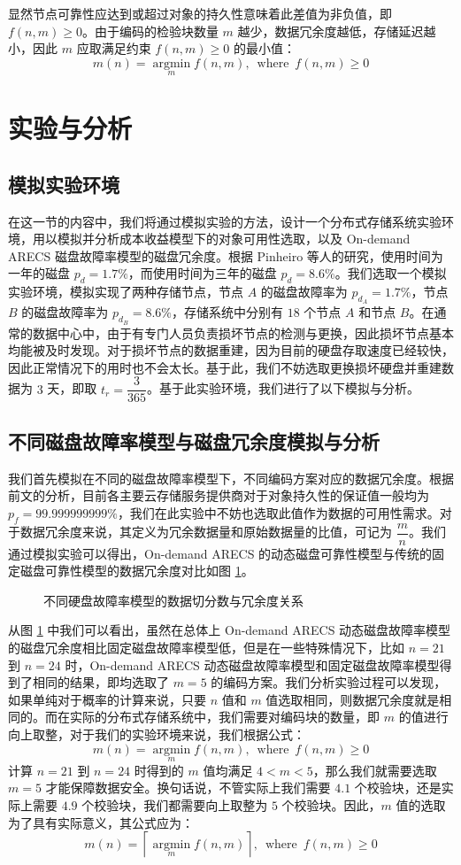 显然节点可靠性应达到或超过对象的持久性意味着此差值为非负值，即 $f(n,m) \geq 0$。由于编码的检验块数量 $m$ 越少，数据冗余度越低，存储延迟越小，因此 $m$ 应取满足约束 $f(n,m) \geq 0$ 的最小值：
$$
m(n)=\operatorname*{argmin}_{m}f(n,m),\ \operatorname*{where}\ f(n,m) \geq 0
$$
\section{实验与分析}
\subsection{模拟实验环境}
在这一节的内容中，我们将通过模拟实验的方法，设计一个分布式存储系统实验环境，用以模拟并分析成本收益模型下的对象可用性选取，以及 On-demand ARECS 磁盘故障率模型的磁盘冗余度。根据 Pinheiro 等人的研究\cite{pinheiro2007failure}，使用时间为一年的磁盘 $p_{d}=1.7\%$，而使用时间为三年的磁盘 $p_{d}=8.6\%$。我们选取一个模拟实验环境，模拟实现了两种存储节点，节点 $A$ 的磁盘故障率为 $p_{d_{A}}=1.7\%$，节点 $B$ 的磁盘故障率为 $p_{d_{B}}=8.6\%$，存储系统中分别有 $18$ 个节点 $A$ 和节点 $B$。在通常的数据中心中，由于有专门人员负责损坏节点的检测与更换，因此损坏节点基本均能被及时发现。对于损坏节点的数据重建，因为目前的硬盘存取速度已经较快，因此正常情况下的用时也不会太长。基于此，我们不妨选取更换损坏硬盘并重建数据为 $3$ 天，即取 $t_{r}=\dfrac{3}{365}$。基于此实验环境，我们进行了以下模拟与分析。
\subsection{不同磁盘故障率模型与磁盘冗余度模拟与分析}
我们首先模拟在不同的磁盘故障率模型下，不同编码方案对应的数据冗余度。根据前文的分析，目前各主要云存储服务提供商对于对象持久性的保证值一般均为 $p_{f}=99.999999999\%$，我们在此实验中不妨也选取此值作为数据的可用性需求。对于数据冗余度来说，其定义为冗余数据量和原始数据量的比值，可记为 $\dfrac{m}{n}$。我们通过模拟实验可以得出，On-demand ARECS 的动态磁盘可靠性模型与传统的固定磁盘可靠性模型的数据冗余度对比如图 \ref{p5}。

\begin{figure}[!htb]
\centering
\resizebox{.8\textwidth}{!}{}
\caption{不同硬盘故障率模型的数据切分数与冗余度关系}
\label{p5}
\end{figure}

从图 \ref{p5} 中我们可以看出，虽然在总体上 On-demand ARECS 动态磁盘故障率模型的磁盘冗余度相比固定磁盘故障率模型低，但是在一些特殊情况下，比如 $n=21$ 到 $n=24$ 时，On-demand ARECS 动态磁盘故障率模型和固定磁盘故障率模型得到了相同的结果，即均选取了 $m=5$ 的编码方案。我们分析实验过程可以发现，如果单纯对于概率的计算来说，只要 $n$ 值和 $m$ 值选取相同，则数据冗余度就是相同的。而在实际的分布式存储系统中，我们需要对编码块的数量，即 $m$ 的值进行向上取整，对于我们的实验环境来说，我们根据公式：
$$
m(n)=\operatorname*{argmin}_{m}f(n,m),\ \operatorname*{where}\ f(n,m) \geq 0
$$
计算 $n=21$ 到 $n=24$ 时得到的 $m$ 值均满足 $4<m<5$，那么我们就需要选取 $m=5$ 才能保障数据安全。换句话说，不管实际上我们需要 $4.1$ 个校验块，还是实际上需要 $4.9$ 个校验块，我们都需要向上取整为 $5$ 个校验块。因此，$m$ 值的选取为了具有实际意义，其公式应为：
$$
m(n)=\left\lceil\operatorname*{argmin}_{m}f(n,m)\right\rceil,\ \operatorname*{where}\ f(n,m) \geq 0
$$

